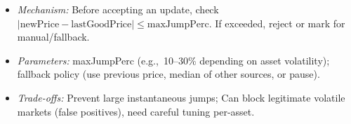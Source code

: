 \begin{itemize}
\begin{itemize}
\begin{itemize}
                    \item \textit{Mechanism:} Before accepting an update, check $|\text{newPrice} - \text{lastGoodPrice}| \leq \text{maxJumpPerc}$. If exceeded, reject or mark for manual/fallback. \cite{chainlink2021defi}
                    \item \textit{Parameters:} maxJumpPerc (e.g.,\ 10--30\% depending on asset volatility); fallback policy (use previous price, median of other sources, or pause).
                    \item \textit{Trade-offs:} Prevent large instantaneous jumps; Can block legitimate volatile markets (false positives), need careful tuning per-asset.
                \end{itemize}
        \end{itemize}


\end{itemize}
